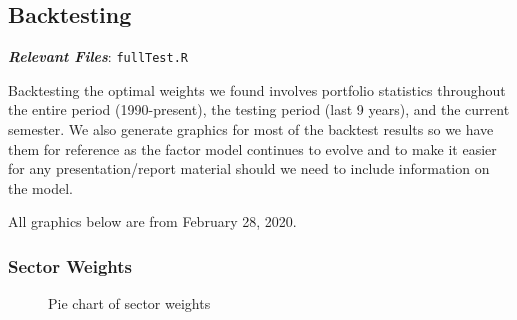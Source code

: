 \documentclass[]{article}
\begin{document}
\hypertarget{backtesting}{%
\subsection{Backtesting}\label{backtesting}}

\textbf{\emph{Relevant Files}}: \texttt{fullTest.R}

Backtesting the optimal weights we found involves portfolio statistics
throughout the entire period (1990-present), the testing period (last 9
years), and the current semester. We also generate graphics for most of
the backtest results so we have them for reference as the factor model
continues to evolve and to make it easier for any presentation/report
material should we need to include information on the model.

All graphics below are from February 28, 2020.

\hypertarget{sector-weights}{%
\subsubsection{Sector Weights}\label{sector-weights}}

\begin{figure}[H]
\centering
{}
\caption{Pie chart of sector weights}
\end{figure}
\end{document}
